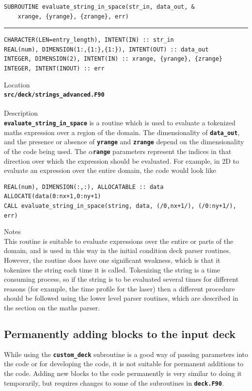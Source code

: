\documentclass[12pt,a4paper]{article}
\newcommand{\HRule}{\rule{\linewidth}{0.5mm}}
\newcommand{\simpleboxverbatim}{\begin{Verbatim}[obeytabs=true,frame=single,
  framerule=0.5mm,rulecolor=\color{warwickmid},formatcom=\color{black}]}
\newcommand{\inlinecode}[1]{{\color{warwickred} \bf\texttt{#1}}}
\newcommand{\codedef}{\begin{Verbatim}[formatcom=\color{warwickred},fontsize=\Large,hfuzz=0pt]}
\newcommand{\coderule}{
{\color{warwickred}\vspace{-0.5cm}\HRule}
\codedef}
\begin{document}
\pagebreak
\codedef
SUBROUTINE evaluate_string_in_space(str_in, data_out, &
    xrange, {yrange}, {zrange}, err)
\end{Verbatim}
\coderule
CHARACTER(LEN=entry_length), INTENT(IN) :: str_in
REAL(num), DIMENSION(1:,{1:},{1:}), INTENT(OUT) :: data_out
INTEGER, DIMENSION(2), INTENT(IN) :: xrange, {yrange}, {zrange}
INTEGER, INTENT(INOUT) :: err
\end{Verbatim}
\vspace{1cm}
{\Large Location\\}
\inlinecode{src/deck/strings\_advanced.F90}\\
\\[0.5cm]
{\Large Description\\}
\inlinecode{evaluate\_string\_in\_space} is a routine which is used to evaluate a
tokenized maths expression over a region of the domain. The dimensionality of
\inlinecode{data\_out}, and the presence or absence of \inlinecode{yrange} and
\inlinecode{zrange} depend on the dimensionality of the code being used. The
\inlinecode{{\it $\alpha$}range} parameters represent the indices in that
direction over which the expression should be evaluated. For example, in 2D to
evaluate an expression over the entire domain, the code would look like
\simpleboxverbatim
REAL(num), DIMENSION(:,:), ALLOCATABLE :: data
ALLOCATE(data(0:nx+1,0:ny+1)
CALL evaluate_string_in_space(string, data, (/0,nx+1/), (/0:ny+1/), err)
\end{Verbatim}
{\Large Notes\\}
This routine is suitable to evaluate expressions over the entire or parts of
the domain, and is used in this way in the initial condition deck parser
routines. However, the routine does have one significant weakness, which is
that it tokenizes the string each time it is called. Tokenizing the string is a
time consuming process, so if the string is to be evaluated several times for
different reasons (for example, the time profile for the laser) then a
different procedure should be followed using the lower level parser routines,
which are described in the section on the maths parser.
\pagebreak

\subsection{Permanently adding blocks to the input deck}

While using the \inlinecode{custom\_deck} subroutine is a good way of passing
parameters into the code or for developing the code, it is not suitable for
permanent additions to the code. Adding new blocks to the code permanently is
very similar to doing it temporarily, but requires changes to some of the
subroutines in \inlinecode{deck.F90}.\\
\end{document}
